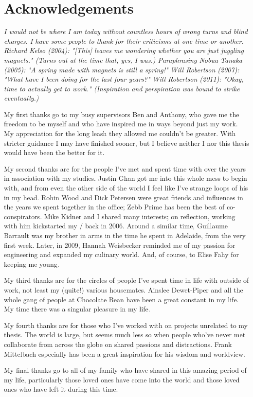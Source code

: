 
\section*{Acknowledgements}

\itshape
I would not be where I am today without countless hours of wrong turns and
blind charges.
I have some people to thank for their criticisms at one time or another.
Richard Kelso (2004): "[This] leaves me wondering whether you are just juggling magnets." (Turns out at the time that, yes, I was.)
Paraphrasing Nobua Tanaka (2005): "A spring made with magnets is still a spring!"
Will Robertson (2007): "What have I been doing for the last four years?"
Will Robertson (2011): "Okay, time to actually get to work."
(Inspiration and perspiration was bound to strike eventually.)

My first thanks go to my busy supervisors Ben and Anthony, who gave me the freedom to be myself and who have inspired me in ways beyond just my work.
My appreciation for the long leash they allowed me couldn't be greater.
With stricter guidance I may have finished sooner, but I believe neither I nor this thesis would have been the better for it.

My second thanks are for the people I've met and spent time with over the years in association with my studies.
Justin Ghan got me into this whole mess to begin with, and from even the other side of the world I feel like I've strange loops of his in my head.
Rohin Wood and Dick Petersen were great friends and influences in the years we spent together in the office; Zebb Prime has been the best of co-conspirators.
Mike Kidner and I shared many interests; on reflection, working with him kickstarted my \PhD/ back in 2006.
Around a similar time, Guillaume Barrault was my brother in arms in the time he spent in Adelaide, from the very first week.
Later, in 2009, Hannah Weisbecker reminded me of my passion for engineering and expanded my culinary world.
And, of course, to Elise Fahy for keeping me young.

My third thanks are for the circles of people I've spent time in life with outside of work, not least my (quite!) various housemates.
Ainslee Dewet-Piper and all the whole gang of people at Chocolate Bean have been a great constant in my life.
My time there was a singular pleasure in my life.

My fourth thanks are for those who I've worked with on projects unrelated to my thesis.
The world is large, but seems much less so when people who've never met collaborate from across the globe on shared passions and distractions.
Frank Mittelbach especially has been a great inspiration for his wisdom and worldview.

My final thanks go to all of my family who have shared in this amazing period of my life, particularly those loved ones have come into the world and those loved ones who have left it during this time.
\upshape
